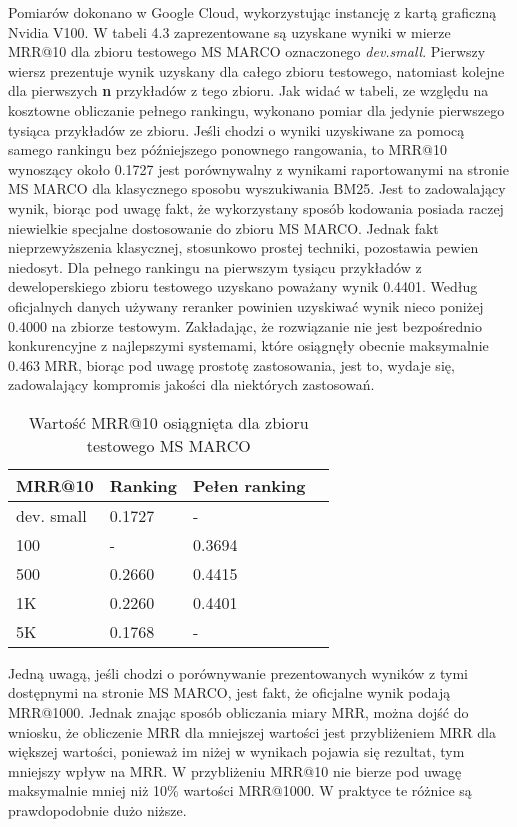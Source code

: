 Pomiarów dokonano w Google Cloud, wykorzystując instancję z kartą graficzną Nvidia V100. W tabeli 4.3 zaprezentowane są uzyskane wyniki w mierze MRR@10 dla zbioru testowego MS MARCO oznaczonego \emph{dev.small}. Pierwszy wiersz prezentuje wynik uzyskany dla całego zbioru testowego, natomiast kolejne dla pierwszych \textbf{n} przykładów z tego zbioru. Jak widać w tabeli, ze względu na kosztowne obliczanie pełnego rankingu, wykonano pomiar dla jedynie pierwszego tysiąca przykładów ze zbioru. Jeśli chodzi o wyniki uzyskiwane za pomocą samego rankingu bez późniejszego ponownego rangowania, to MRR@10 wynoszący około 0.1727 jest porównywalny z wynikami raportowanymi na stronie MS MARCO dla klasycznego sposobu wyszukiwania BM25. Jest to zadowalający wynik, biorąc pod uwagę fakt, że wykorzystany sposób kodowania posiada raczej niewielkie specjalne dostosowanie do zbioru MS MARCO. Jednak fakt nieprzewyższenia klasycznej, stosunkowo prostej techniki, pozostawia pewien niedosyt. Dla pełnego rankingu na pierwszym tysiącu przykładów z deweloperskiego zbioru testowego uzyskano poważany wynik 0.4401. Według oficjalnych danych używany reranker powinien uzyskiwać wynik nieco poniżej 0.4000 na zbiorze testowym. Zakładając, że rozwiązanie nie jest bezpośrednio konkurencyjne z najlepszymi systemami, które osiągnęły obecnie maksymalnie 0.463 MRR, biorąc pod uwagę prostotę zastosowania, jest to, wydaje się, zadowalający kompromis jakości dla niektórych zastosowań. \newline


\begin{table}[htp]
\centering
\caption{Wartość MRR@10 osiągnięta dla zbioru testowego MS MARCO\protect\footnotemark[1]}
\vspace*{5mm}
\begin{tabular}{llll}
\hline
 MRR@10 & Ranking & Pełen ranking & \\
 \hline
 dev. small & 0.1727 & - & \\
 100 & - & 0.3694 & \\
 500 & 0.2660 & 0.4415 \\
 1K & 0.2260 & 0.4401 \\
 5K & 0.1768 &  - \\
 \hline
\end{tabular}
\end{table}

Jedną uwagą, jeśli chodzi o porównywanie prezentowanych wyników z tymi dostępnymi na stronie MS MARCO, jest fakt, że oficjalne wynik podają MRR@1000. Jednak znając sposób obliczania miary MRR, można dojść do wniosku, że obliczenie MRR dla mniejszej wartości jest przybliżeniem MRR dla większej wartości, ponieważ im niżej w wynikach pojawia się rezultat, tym mniejszy wpływ na MRR. W przybliżeniu MRR@10 nie bierze pod uwagę maksymalnie mniej niż 10\% wartości MRR@1000. W praktyce te różnice są prawdopodobnie dużo niższe.\newline

